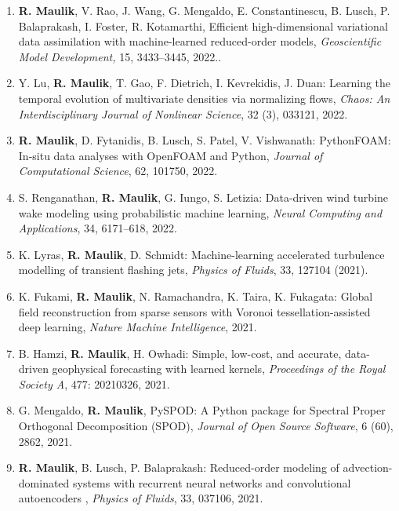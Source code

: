 \documentclass[letterpaper]{article}
\begin{document}
\begin{enumerate}
\item \textbf{R. Maulik}, V. Rao, J. Wang, G. Mengaldo, E. Constantinescu, B. Lusch, P. Balaprakash, I. Foster, R. Kotamarthi, Efficient high-dimensional variational data assimilation with machine-learned reduced-order models, {\it Geoscientific Model Development,} 15, 3433–3445, 2022..

\item Y. Lu, \textbf{R. Maulik}, T. Gao, F. Dietrich, I. Kevrekidis, J. Duan: Learning the temporal evolution of multivariate densities via normalizing flows, {\it Chaos: An Interdisciplinary Journal of Nonlinear Science}, 32 (3), 033121, 2022.

\item \textbf{R. Maulik}, D. Fytanidis, B. Lusch, S. Patel, V. Vishwanath: PythonFOAM: In-situ data analyses with OpenFOAM and Python, {\it Journal of Computational Science}, 62, 101750, 2022.

\item S. Renganathan, \textbf{R. Maulik}, G. Iungo, S. Letizia: Data-driven wind turbine wake modeling using probabilistic machine learning, {\it Neural Computing and Applications}, 34, 6171–618, 2022.

\item K. Lyras, \textbf{R. Maulik}, D. Schmidt: Machine-learning accelerated turbulence modelling of transient flashing jets, {\it Physics of Fluids}, 33, 127104 (2021).

\item K. Fukami, \textbf{R. Maulik}, N. Ramachandra, K. Taira, K. Fukagata: Global field reconstruction from sparse sensors with Voronoi tessellation-assisted deep learning, {\it Nature Machine Intelligence}, 2021.

\item B. Hamzi, \textbf{R. Maulik}, H. Owhadi: Simple, low-cost, and accurate, data-driven geophysical forecasting with learned kernels, {\it Proceedings of the Royal Society A}, 477: 20210326, 2021.

\item G. Mengaldo, \textbf{R. Maulik}, PySPOD: A Python package for Spectral Proper Orthogonal Decomposition (SPOD), {\it Journal of Open Source Software}, 6 (60), 2862, 2021.

\item \textbf{R. Maulik}, B. Lusch, P. Balaprakash: Reduced-order modeling of advection-dominated systems with recurrent neural networks and convolutional autoencoders , {\it Physics of Fluids}, 33, 037106, 2021.


\end{enumerate}
\end{document}

